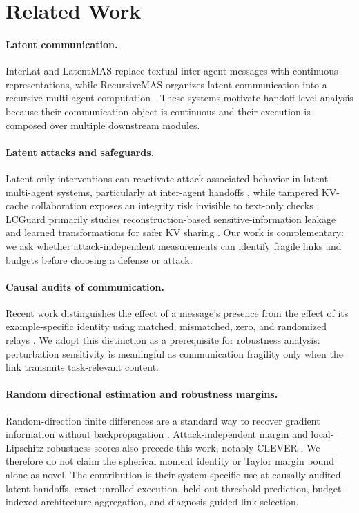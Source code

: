 \documentclass[11pt]{article}
\begin{document}
\section{Related Work}
\label{sec:related-work}

\paragraph{Latent communication.}
InterLat and LatentMAS replace textual inter-agent messages with continuous
representations, while RecursiveMAS organizes latent communication into a
recursive multi-agent computation \cite{du2025interlat,zou2025latentmas,
yang2026recursivemas}. These systems motivate handoff-level analysis because
their communication object is continuous and their execution is composed over
multiple downstream modules.

\paragraph{Latent attacks and safeguards.}
Latent-only interventions can reactivate attack-associated behavior in latent
multi-agent systems, particularly at inter-agent handoffs
\cite{wang2026outofsight}, while tampered KV-cache collaboration exposes an
integrity risk invisible to text-only checks \cite{brito2026latentagents}.
LCGuard primarily studies reconstruction-based sensitive-information leakage
and learned transformations for safer KV sharing \cite{asif2026lcguard}.
Our work is complementary: we ask whether attack-independent measurements can
identify fragile links and budgets before choosing a defense or attack.

\paragraph{Causal audits of communication.}
Recent work distinguishes the effect of a message's presence from the effect
of its example-specific identity using matched, mismatched, zero, and randomized
relays \cite{cheng2026when,zhang2026channels}. We adopt this distinction as a
prerequisite for robustness analysis: perturbation sensitivity is meaningful as
communication fragility only when the link transmits task-relevant content.

\paragraph{Random directional estimation and robustness margins.}
Random-direction finite differences are a standard way to recover gradient
information without backpropagation \cite{nesterov2017random}. Attack-independent
margin and local-Lipschitz robustness scores also precede this work, notably
CLEVER \cite{weng2018clever}. We therefore do not claim the spherical moment
identity or Taylor margin bound alone as novel. The contribution is their
system-specific use at causally audited latent handoffs, exact unrolled
execution, held-out threshold prediction, budget-indexed architecture
aggregation, and diagnosis-guided link selection.
\end{document}
